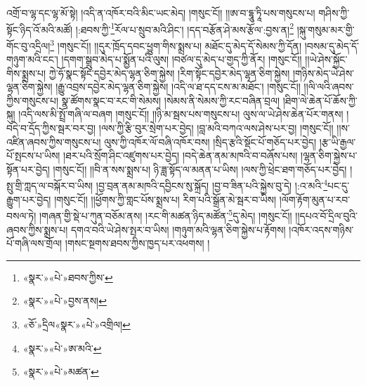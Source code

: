 འགྲོ་བ་ལྷ་དང་ལྷ་མོ་སྟེ། །འདི་ན་འཁོར་བའི་མིང་ཡང་མེད། །གསུང་ངོ།། །།ཨ་བ་དྷཱུ་ཏཱི་པས་གསུངས་པ། གཤིས་ཀྱི་སྟོང་ཉིད་འོ་མའི་མཚོ། །:ཐབས་ཀྱི་\footnote{«སྣར་»«པེ་»ཐབས་ཀྱིས་}རོལ་པ་སྲུབ་མའི་ཤིང་། །དད་བརྩོན་ཤེ་མས་རྩོལ་:བྱས་ན།\footnote{«སྣར་»«པེ་»བྱས་ནས།} །སྐུ་གསུམ་མར་གྱི་གོང་བུ་འདྲིལ།\footnote{«ཅོ་»དྲིལ«སྣར་»«པེ་»འགྲིལ།} །གསུང་ངོ།། །།དུར་ཁྲོད་དབང་ཕྱུག་གིས་སྨྲས་པ། མཐོང་དུ་མེད་དོ་སེམས་ཀྱི་དོན། །བསམ་དུ་མེད་དོ་གཉུག་མའི་ངང་། །དགག་སྒྲུབ་མེད་པ་སྨྱོན་པའི་ལུས། །བཙལ་དུ་མེད་པ་གྱད་ཀྱི་ནོར། །གསུང་ངོ།། །།ཡེ་ཤེས་སྐྱོང་གིས་སྨྲས་པ། ཀྱེ་ཧོ་སྣང་སྟོང་དབྱེར་མེད་ལྷན་ཅིག་སྐྱེས། །རིག་སྟོང་དབྱེར་མེད་ལྷན་ཅིག་སྐྱེས། །གཉིས་མེད་ཡེ་ཤེས་ལྷན་ཅིག་སྐྱེས། །རྒྱུ་འབྲས་དབྱེར་མེད་ལྷན་ཅིག་སྐྱེས། །འདི་ལ་ཐ་དད་ངས་མ་མཐོང་། །གསུང་ངོ།། །།ལི་ལའི་ཞབས་ཀྱིས་གསུངས་པ། སྣ་ཚོགས་སྣང་བ་རང་གི་སེམས། །སེམས་ནི་སེམས་ཀྱི་རང་བཞིན་བྲལ། །ཐིག་ལེ་ཆེན་པོ་ཆོས་ཀྱི་སྐུ། །འདི་ལས་མི་སྤྲོ་གཞི་ལ་བཞག །གསུང་ངོ།། །།ཉི་མ་སྦས་པས་གསུངས་པ། ལུས་ལ་ཡེ་ཤེས་ཆེན་པོར་གནས། །བདེ་བ་དྲོད་ཀྱིས་སྦར་བར་བྱ། །ལས་ཀྱི་རྩི་བུར་སྲེག་པར་བྱེད། །བླ་མའི་བཀའ་ལས་ཤེས་པར་བྱ། །གསུང་ངོ།། །།ས་འཛིན་ཞབས་ཀྱིས་གསུངས་པ། ལུས་ཀྱི་འཁོར་ལོ་བཞི་འཁོར་བས། །སྲིད་རྩའི་སྡོང་པོ་གཅོད་པར་བྱེད། །རྩ་ཡི་རྒྱལ་པོ་སྤངས་པ་ཡིས། །ཐར་པའི་སྲོག་ཤིང་འཛུགས་པར་བྱེད། །བདེ་ཆེན་ནམ་མཁའི་བ་བཞོས་པས། །ལྷན་ཅིག་སྐྱེས་པ་སྟོན་པར་བྱེད། །གསུང་ངོ།། །།བི་ན་སས་སྨྲས་པ། ཉི་ཟླ་སྟོད་ལ་མནན་པ་ཡིས། །ལས་ཀྱི་ཕྲེང་ཐག་གཅོད་པར་བྱེད། །སྤུ་གྲི་ཀླད་ལ་བསྐོར་བ་ཡིས། །བྱ་བྲན་ནམ་མཁའི་དབྱིངས་སུ་སྐྲོད། །བྱ་བ་ཟིན་པའི་སྐྱེས་བུ་དེ། །:འ་མའི་\footnote{«སྣར་»«པེ་»ཨ་མའི་}པང་དུ་རྒྱུག་པར་བྱེད། །གསུང་ངོ།། །།ཕྱོགས་ཀྱི་གླང་པོས་སྨྲས་པ། རིག་པའི་སྒྲོན་མེ་སྦར་བ་ཡིས། །ལོག་རྟོག་མུན་པ་རབ་བསལ་ཏེ། །གཞན་གྱི་སྡེ་པ་ཀུན་བཅོམ་ནས། །རང་གི་མཚན་ཉིད་མཚོན་\footnote{«སྣར་»«པེ་»མཚན་}དུ་མེད། །གསུང་ངོ།། །།དཔའ་བོ་དྲིལ་བུའི་ཞབས་ཀྱིས་སྨྲས་པ། དགའ་བའི་ཡེ་ཤེས་སྤར་བ་ཡིས། །གཉུག་མའི་ལྷན་ཅིག་སྐྱེས་པ་རྟོགས། །འཁོར་འདས་གཉིས་པོ་གཞི་ལས་གྲོལ། །གསང་སྔགས་ཐབས་ཀྱིས་ཁྱད་པར་འཕགས། །
